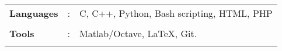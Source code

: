 \documentclass[10pt]{article}
\newcommand\hs{1.3mm}		%
\begin{document}
	
	
	\vspace{0.1cm}
\colorbox{bl}{}\\
\begin{tabular}{m{1in}m{0.20in}m{4.5in}}
	\\[-3mm]
	\hspace{\hs} \hspace{0.12cm}\textbf{\textbf{Languages}} &: & {{C, C++, Python, Bash scripting, HTML, PHP}} \\
	\\[-3.5mm]
	\hspace{\hs} \hspace{0.12cm}\textbf{\textbf{Tools}} &: & {Matlab/Octave, \LaTeX, Git.}\\
	\\[-4mm]
\end{tabular}\\



\colorbox{bl}{}
\end{document}
